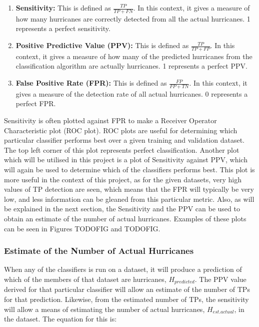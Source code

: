 \documentclass[pdftex,12pt,a4paper]{report}
\begin{document}
\begin{enumerate}
    \item \textbf{Sensitivity:} This is defined as $\frac{TP}{TP + FN}$. In this context, it gives a
        measure of how many hurricanes are correctly detected from all the actual hurricanes. 1
        represents a perfect sensitivity.
    \item \textbf{Positive Predictive Value (PPV):} This is defined as $\frac{TP}{TP + FP}$. In this
        context, it gives a measure of how many of the predicted hurricanes from the classification
        algorithm are actually hurricanes. 1 represents a perfect PPV.
    \item \textbf{False Positive Rate (FPR):} This is defined as $\frac{FP}{FP + TN}$. In this
        context, it gives a measure of the detection rate of all actual hurricanes. 0 represents a
        perfect FPR.
\end{enumerate}

Sensitivity is often plotted against FPR to make a Receiver Operator Characteristic plot (ROC plot).
ROC plots are useful for determining which particular classifier performs best over a given training
and validation dataset. The top left corner of this plot represents perfect classification.  Another
plot which will be utilised in this project is a plot of Sensitivity against PPV, which will again
be used to determine which of the classifiers performs best. This plot is more useful in the context
of this project, as for the given datasets, very high values of TP detection are seen, which means
that the FPR will typically be very low, and less information can be gleaned from this particular
metric. Also, as will be explained in the next section, the Sensitivity and the PPV can be used to
obtain an estimate of the number of actual hurricanes. Examples of these plots can be seen in
Figures TODOFIG and TODOFIG.

\subsubsection{Estimate of the Number of Actual Hurricanes}

When any of the classifiers is run on a dataset, it will produce a prediction of which of the
members of that dataset are hurricanes, $H_{predicted}$. The PPV value derived for that particular classifier will
allow an estimate of the number of TPs for that prediction. Likewise, from the estimated number of
TPs, the sensitivity will allow a means of estimating the number of actual hurricanes, $H_{est. actual}$,
in the dataset. The equation for this is:
\end{document}
